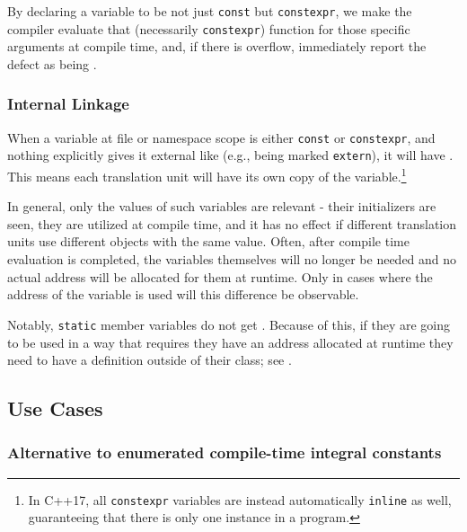 \noindent By declaring a variable to be not just \lstinline!const! but
\lstinline!constexpr!, we make the compiler evaluate that (necessarily
\lstinline!constexpr!) function for those specific arguments at compile
time, and, if there is overflow, immediately report the defect as being
.

\subsubsection[Internal Linkage]{Internal Linkage}

When a variable at file or namespace scope is either \lstinline!const! or \lstinline!constexpr!,
and nothing explicitly gives it external like (e.g., being marked \lstinline!extern!), it
will have .  This means each translation unit will have its own copy of the
variable.{\cprotect\footnote{In C++17, all \lstinline!constexpr! variables are instead automatically \lstinline!inline! as well,
guaranteeing that there is only one instance in a program.}}

In general, only the values of such variables are relevant - their initializers are seen, they are utilized
at compile time, and it has no effect if different translation units use different objects with the same
value.  Often, after compile time evaluation is completed, the variables themselves will no longer be
needed and no actual address will be allocated for them at runtime.   Only in cases where the address of
the variable is used will this difference be observable.

Notably, \lstinline!static! member variables do not get .  Because of this, if they
are going to be used in a way that requires they have an address allocated at runtime they need to have a
definition outside of their class; see .

\subsection[Use Cases]{Use Cases}\label{use-cases}

\subsubsection[Alternative to enumerated compile-time integral constants]{Alternative to enumerated compile-time integral constants}\label{alternative-to-enumerated-compile-time-integral-constants}

